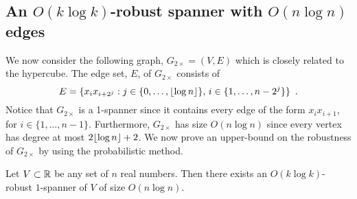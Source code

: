 \documentclass{cccg12}
\begin{document}
\subsection{An $O(k\log k)$-robust spanner with $O(n\log n)$ edges}

We now consider the following graph, $G_{2\times}=(V,E)$ which is
closely related to the hypercube.   The edge set, $E$, of $G_{2\times}$
consists of
\[
  E = \{x_ix_{i+2^j} : j\in\{0,\ldots,{\lfloor \log n \rfloor}\},\, 
        i\in\{1,\ldots,n-2^j\} \} \enspace .
\] 
Notice that $G_{2\times}$ is a 1-spanner since it contains every
edge of the form $x_ix_{i+1}$, for $i\in\{1,\ldots,n-1\}$. Furthermore,
$G_{2\times}$ has size $O(n\log n)$ since every vertex has degree at most
$2{\lfloor \log n \rfloor}+2$.  We now prove an upper-bound on the robustness of
$G_{2\times}$ by using the probabilistic method.

\begin{thm}
  Let $V\subset \mathbb{R}$ be any set of $n$ real numbers.  Then there exists
  an $O(k\log k)$-robust $1$-spanner of $V$ of size $O(n\log n)$.
\end{thm}
\end{document}
